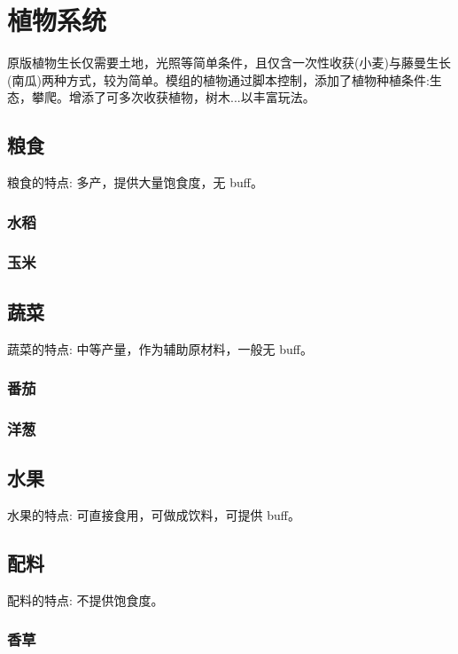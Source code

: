\section{植物系统}

原版植物生长仅需要土地，光照等简单条件，且仅含一次性收获(小麦)与藤曼生长(南瓜)两种方式，较为简单。模组的植物通过脚本控制，添加了植物种植条件:生态，攀爬。增添了可多次收获植物，树木...以丰富玩法。

\subsection{粮食}

粮食的特点: 多产，提供大量饱食度，无 buff。

\subsubsection{水稻}

\subsubsection{玉米}

\subsection{蔬菜}

蔬菜的特点: 中等产量，作为辅助原材料，一般无 buff。

\subsubsection{番茄}

\subsubsection{洋葱}

\subsection{水果}

水果的特点: 可直接食用，可做成饮料，可提供 buff。

\subsection{配料}

配料的特点: 不提供饱食度。

\subsubsection{香草}


